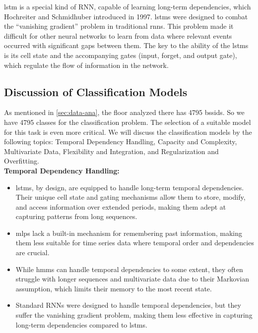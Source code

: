 \ac{lstm} is a special kind of RNN, capable of learning long-term dependencies, which Hochreiter and Schmidhuber introduced in 1997\cite{lstm-hochreiter}.
\acp{lstm} were designed to combat the ``vanishing gradient'' problem in traditional \acp{rnn}. 
This problem made it difficult for other neural networks to learn from data where relevant events occurred with significant gaps between them.
The key to the ability of the \acp{lstm} is its cell state and the accompanying gates (input, forget, and output gate), which regulate the flow of information in the network.



\subsection{Discussion of Classification Models}
As mentioned in \cref{sec:data-ana}, the floor analyzed there has 4795 \acp{bssid}.
So we have 4795 classes for the classification problem.
The selection of a suitable model for this task is even more critical.
We will discuss the classification models by the following topics: Temporal Dependency Handling, Capacity and Complexity, Multivariate Data, Flexibility and Integration, and Regularization and Overfitting. \\

\textbf{Temporal Dependency Handling:}
\begin{itemize}
    \item \acp{lstm}, by design, are equipped to handle long-term temporal dependencies. Their unique cell state and gating mechanisms allow them to store, modify, and access information over extended periods, making them adept at capturing patterns from long sequences.
    \item \acp{mlp} lack a built-in mechanism for remembering past information, making them less suitable for time series data where temporal order and dependencies are crucial.
    \item While \acp{hmm} can handle temporal dependencies to some extent, they often struggle with longer sequences and multivariate data due to their Markovian assumption, which limits their memory to the most recent state.
    \item Standard RNNs were designed to handle temporal dependencies, but they suffer the vanishing gradient problem, making them less effective in capturing long-term dependencies compared to \acp{lstm}\cite{rnn_difficulties_2013}.
\end{itemize}

